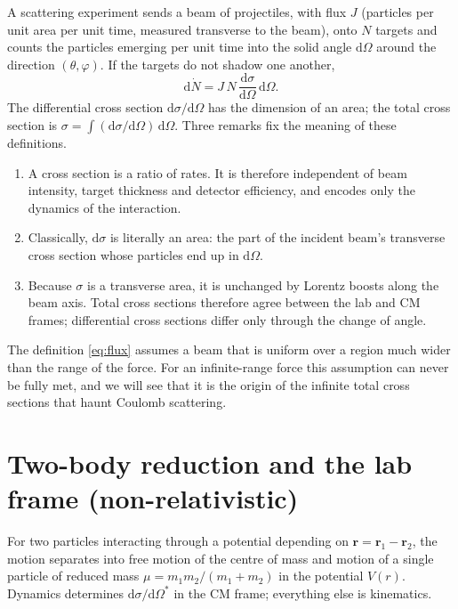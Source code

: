 \documentclass[11pt,a4paper]{book}
\numberwithin{equation}{chapter}
\newcommand{\dd}{\mathrm{d}}
\newcommand{\vr}{\bm{r}}
\newcommand{\dsdO}{\frac{\dd\sigma}{\dd\Omega}}
\begin{document}
A scattering experiment sends a beam of projectiles, with flux $J$ (particles
per unit area per unit time, measured transverse to the beam), onto $N$ targets
and counts the particles emerging per unit time into the solid angle
$\dd\Omega$ around the direction $(\theta,\varphi)$. If the targets do not
shadow one another,
\begin{equation}\label{eq:flux}
  \dd\dot N = J\,N\,\dsdO\,\dd\Omega .
\end{equation}
The differential cross section $\dd\sigma/\dd\Omega$ has the dimension of an
area; the total cross section is $\sigma=\int(\dd\sigma/\dd\Omega)\,\dd\Omega$.
Three remarks fix the meaning of these definitions.
\begin{enumerate}
  \item A cross section is a ratio of rates. It is therefore independent of
        beam intensity, target thickness and detector efficiency, and encodes
        only the dynamics of the interaction.
  \item Classically, $\dd\sigma$ is literally an area: the part of the
        incident beam's transverse cross section whose particles end up in
        $\dd\Omega$.
  \item Because $\sigma$ is a transverse area, it is unchanged by Lorentz
        boosts along the beam axis. Total cross sections therefore agree
        between the lab and CM frames; differential cross sections differ only
        through the change of angle.
\end{enumerate}
The definition \eqref{eq:flux} assumes a beam that is uniform over a region much
wider than the range of the force. For an infinite-range force this assumption
can never be fully met, and we will see that it is the origin of the infinite
total cross sections that haunt Coulomb scattering.

\section{Two-body reduction and the lab frame (non-relativistic)}

For two particles interacting through a potential depending on
$\vr=\vr_1-\vr_2$, the motion separates into free motion of the centre of mass
and motion of a single particle of reduced mass $\mu=m_1m_2/(m_1+m_2)$ in the
potential $V(r)$. Dynamics determines $\dd\sigma/\dd\Omega^*$ in the CM frame;
everything else is kinematics.
\end{document}
